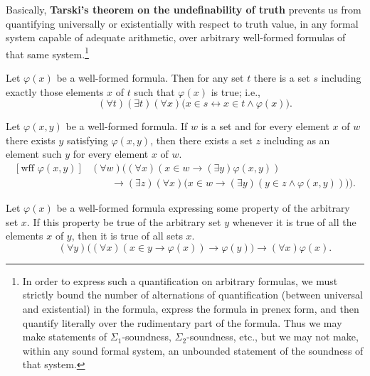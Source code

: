 \documentclass[letterpaper]{article}
\begin{document}
Basically, \textbf{Tarski's theorem on the undefinability of truth} prevents us from quantifying universally or existentially with respect to truth value, in any formal system capable of adequate arithmetic, over arbitrary well-formed formulas of that same system.\footnote{In order to express such a quantification on arbitrary formulas, we must strictly bound the number of alternations of quantification (between universal and existential) in the formula, express the formula in prenex form, and then quantify literally over the rudimentary part of the formula. Thus we may make statements of $\Sigma_1$-soundness, $\Sigma_2$-soundness, etc., but we may not make, within any sound formal system, an unbounded statement of the soundness of that system.}

\begin{axiomschema}[Comprehension]\label{comprehensionschema}
	Let $\varphi(x)$ be a well-formed formula. Then for any set $t$ there is a set $s$ including exactly those elements $x$ of $t$ such that $\varphi(x)$ is true; i.e.,
	\begin{equation}
	[\textrm{wff }\varphi(x)]\qquad(\forall t)(\exists t)(\forall x)\big(x\in s\longleftrightarrow x\in t\land\varphi(x)\big).
	\end{equation}
\end{axiomschema}
\begin{axiomschema}[Replacement]\label{replacementschema}
	Let $\varphi(x,y)$ be a well-formed formula.  If $w$ is a set and for every element $x$ of $w$ there exists $y$ satisfying $\varphi(x,y)$, then there exists a set $z$ including as an element such $y$ for every element $x$ of $w$.
	\begin{equation}
	\begin{array}{rl}
	[\textrm{wff }\varphi(x,y)]
	& (\forall w)\Big((\forall x)(x\in w\longrightarrow(\exists y)\varphi(x,y)) \\
	&\qquad	\longrightarrow (\exists z)(\forall x)\big(x\in w\longrightarrow (\exists y)(y\in z\land\varphi(x,y))\big)\Big).
	\end{array}
	\end{equation}
\end{axiomschema}
\begin{axiomschema}[Regularity]\label{regularityschema}
	Let $\varphi(x)$ be a well-formed formula expressing some property of the arbitrary set $x$.  If this property be true of the arbitrary set $y$ whenever it is true of all the elements $x$ of $y$, then it is true of all sets $x$.
	\begin{equation}
	[\textrm{wff }\varphi(x)]\qquad (\forall y)\big((\forall x)(x\in y\longrightarrow\varphi(x))\longrightarrow\varphi(y)\big)\longrightarrow(\forall x)\varphi(x).
	\end{equation}
\end{axiomschema}
\end{document}
